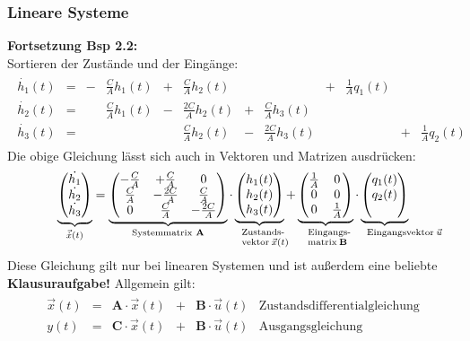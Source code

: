 \message{ !name(Mitschrieb_SysRegel.tex)}\documentclass[12pt,a4paper,ngerman]{scrartcl}
\begin{document}
\subsubsection{Lineare Systeme}

\textbf{Fortsetzung Bsp 2.2:}\\
Sortieren der Zustände und der Eingänge:
\begin{align*}
  \begin{array}{lllllllllllll}
    \dot{h_1}(t)&=&-&\frac{C}{A}h_1(t)&+&\frac{C}{A}h_2(t)&&&+&\frac{1}{A}q_1(t)\\
    \dot{h_2}(t)&=&&\frac{C}{A}h_1(t)&-&\frac{2C}{A}h_2(t)&+&\frac{C}{A}h_3(t)\\
    \dot{h_3}(t)&=&&&&\frac{C}{A}h_2(t)&-&\frac{2C}{A}h_3(t)&&&+&\frac{1}{A}q_2(t)
  \end{array}
\end{align*}
Die obige Gleichung lässt sich auch in Vektoren und Matrizen ausdrücken:
\begin{align*}\underbrace{
  \begin{pmatrix}
    \dot{h_1}\\
    \dot{h_2}\\
    \dot{h_3}
  \end{pmatrix}}_{\vec{\dot{x}}(t)}
=
\underbrace{
\begin{pmatrix}
  -\frac{C}{A}&+\frac{C}{A}&0\\
  \frac{C}{A}&-\frac{2C}{A}&\frac{C}{A}\\
  0&\frac{C}{A}&-\frac{2C}{A}
\end{pmatrix}}_{\text{Systemmatrix }\mathbf{A}}
\cdot
\underbrace{
\begin{pmatrix}
h_1(t)\\
h_2(t)\\
h_3(t)  
\end{pmatrix}}_{\parbox{1cm}{\scriptsize Zustands\-vektor~$\vec{x}(t)$}}
+
\underbrace{
\begin{pmatrix}
\frac{1}{A}&0\\
0&0\\
0&\frac{1}{A}  
\end{pmatrix}}_{\parbox{1cm}{\scriptsize Eingangs\-matrix~$\mathbf{B}$}}
\cdot
\underbrace{
  \begin{pmatrix}
    q_1(t)\\
    q_2(t)\\
~
  \end{pmatrix}}_{\parbox{1cm}{\scriptsize Eingangsvektor~$\vec{u}$}}
\end{align*}
Diese Gleichung gilt nur bei linearen Systemen und ist außerdem eine beliebte \textbf{Klausuraufgabe!} Allgemein gilt:
\begin{align*}
  \begin{array}{lllllll}
    \vec{x}(t)&=&\mathbf{A}\cdot\vec{x}(t)&+&\mathbf{B}\cdot\vec{u}(t)&\text{Zustandsdifferentialgleichung}\\
    y(t)&=&\mathbf{C}\cdot \vec{x}(t)&+&\mathbf{B}\cdot\vec{u}(t)&\text{Ausgangsgleichung}
  \end{array}
\end{align*}
\end{document}
